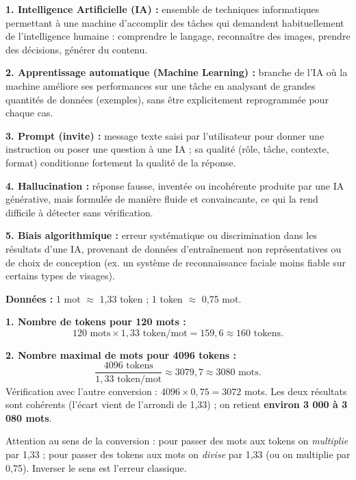 \documentclass[11pt]{article}
\newcommand{\cle}[1]{{\popxbold\color{popdark}#1}}
\begin{document}
\begin{corrige}
\textbf{1. \cle{Intelligence Artificielle (IA)} :} ensemble de techniques informatiques permettant à une machine d'accomplir des tâches qui demandent habituellement de l'intelligence humaine : comprendre le langage, reconnaître des images, prendre des décisions, générer du contenu.

\textbf{2. \cle{Apprentissage automatique (Machine Learning)} :} branche de l'IA où la machine améliore ses performances sur une tâche en analysant de grandes quantités de données (exemples), sans être explicitement reprogrammée pour chaque cas.

\textbf{3. \cle{Prompt (invite)} :} message texte saisi par l'utilisateur pour donner une instruction ou poser une question à une IA ; sa qualité (rôle, tâche, contexte, format) conditionne fortement la qualité de la réponse.

\textbf{4. \cle{Hallucination} :} réponse fausse, inventée ou incohérente produite par une IA générative, mais formulée de manière fluide et convaincante, ce qui la rend difficile à détecter sans vérification.

\textbf{5. \cle{Biais algorithmique} :} erreur systématique ou discrimination dans les résultats d'une IA, provenant de données d'entraînement non représentatives ou de choix de conception (ex. un système de reconnaissance faciale moins fiable sur certains types de visages).
\end{corrige}

\begin{corrige}
\textbf{Données :} 1 mot $\approx$ 1,33 token ; 1 token $\approx$ 0,75 mot.

\textbf{1. Nombre de tokens pour 120 mots :}
\[
120 \text{ mots} \times 1{,}33 \text{ token/mot} = 159{,}6 \approx 160 \text{ tokens}.
\]

\textbf{2. Nombre maximal de mots pour 4096 tokens :}
\[
\frac{4096 \text{ tokens}}{1{,}33 \text{ token/mot}} \approx 3079{,}7 \approx 3080 \text{ mots}.
\]
Vérification avec l'autre conversion : $4096 \times 0{,}75 = 3072$ mots. Les deux résultats sont cohérents (l'écart vient de l'arrondi de 1,33) ; on retient \textbf{environ 3 000 à 3 080 mots}.
\end{corrige}

\begin{attention}
Attention au sens de la conversion : pour passer des mots aux tokens on \emph{multiplie} par 1,33 ; pour passer des tokens aux mots on \emph{divise} par 1,33 (ou on multiplie par 0,75). Inverser le sens est l'erreur classique.
\end{attention}
\end{document}
